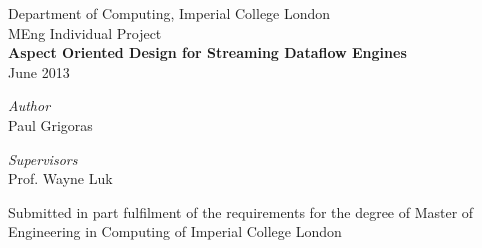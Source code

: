\begin{titlepage}

\begin{center}

{\Large Department of Computing, Imperial College London}
\HRule \\[0.4cm]
{\Large MEng Individual Project} \\ [5cm]

{\huge \bfseries Aspect Oriented Design for Streaming Dataflow Engines}\\[0.5cm]
{\Large June 2013} \\ [3cm]

\begin{minipage}[t]{0.4\textwidth}
\begin{flushleft} \large
\emph{Author} \\[0.5cm]
{Paul Grigoras} \\[0.5cm]

\end{flushleft}
\end{minipage}
\begin{minipage}[t]{0.4\textwidth}
\begin{flushright} \large
\emph{Supervisors} \\[0.5cm]
Prof. Wayne Luk \\[0.3cm]
\end{flushright}
\end{minipage}

\vfill

\begin{minipage}{0.75\textwidth}
\begin{center}
Submitted in part fulfilment of the requirements for the degree of
Master of Engineering in Computing of Imperial College London
\end{center}
\end{minipage}

\end{center}
\end{titlepage}
